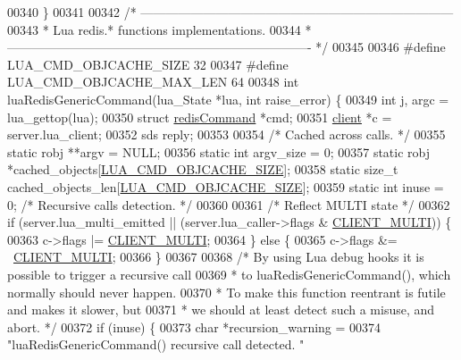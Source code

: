 \begin{DoxyCode}
{{{{00340 \}
00341 
00342 \textcolor{comment}{/* ---------------------------------------------------------------------------}
00343 \textcolor{comment}{ * Lua redis.* functions implementations.}
00344 \textcolor{comment}{ * ------------------------------------------------------------------------- */}
00345 
00346 \textcolor{preprocessor}{#}\textcolor{preprocessor}{define} \textcolor{preprocessor}{LUA\_CMD\_OBJCACHE\_SIZE} 32
00347 \textcolor{preprocessor}{#}\textcolor{preprocessor}{define} \textcolor{preprocessor}{LUA\_CMD\_OBJCACHE\_MAX\_LEN} 64
00348 \textcolor{keywordtype}{int} luaRedisGenericCommand(lua\_State *lua, \textcolor{keywordtype}{int} raise\_error) \{
00349     \textcolor{keywordtype}{int} j, argc = lua\_gettop(lua);
00350     \textcolor{keyword}{struct} \hyperlink{structredisCommand}{redisCommand} *cmd;
00351     \hyperlink{structclient}{client} *c = server.lua\_client;
00352     sds reply;
00353 
00354     \textcolor{comment}{/* Cached across calls. */}
00355     \textcolor{keyword}{static} robj **argv = NULL;
00356     \textcolor{keyword}{static} \textcolor{keywordtype}{int} argv\_size = 0;
00357     \textcolor{keyword}{static} robj *cached\_objects[\hyperlink{scripting_8c_a850a6381c0da4c20a2a6bfdd1cd179b4}{LUA\_CMD\_OBJCACHE\_SIZE}];
00358     \textcolor{keyword}{static} size\_t cached\_objects\_len[\hyperlink{scripting_8c_a850a6381c0da4c20a2a6bfdd1cd179b4}{LUA\_CMD\_OBJCACHE\_SIZE}];
00359     \textcolor{keyword}{static} \textcolor{keywordtype}{int} inuse = 0;   \textcolor{comment}{/* Recursive calls detection. */}
00360 
00361     \textcolor{comment}{/* Reflect MULTI state */}
00362     \textcolor{keywordflow}{if} (server.lua\_multi\_emitted || (server.lua\_caller->flags & 
      \hyperlink{server_8h_a7f61f783f429419f8c593291a509b03a}{CLIENT\_MULTI})) \{
00363         c->flags |= \hyperlink{server_8h_a7f61f783f429419f8c593291a509b03a}{CLIENT\_MULTI};
00364     \} \textcolor{keywordflow}{else} \{
00365         c->flags &= ~\hyperlink{server_8h_a7f61f783f429419f8c593291a509b03a}{CLIENT\_MULTI};
00366     \}
00367 
00368     \textcolor{comment}{/* By using Lua debug hooks it is possible to trigger a recursive call}
00369 \textcolor{comment}{     * to luaRedisGenericCommand(), which normally should never happen.}
00370 \textcolor{comment}{     * To make this function reentrant is futile and makes it slower, but}
00371 \textcolor{comment}{     * we should at least detect such a misuse, and abort. */}
00372     \textcolor{keywordflow}{if} (inuse) \{
00373         \textcolor{keywordtype}{char} *recursion\_warning =
00374             \textcolor{stringliteral}{"luaRedisGenericCommand() recursive call detected. "}
}}}}
\end{DoxyCode}
